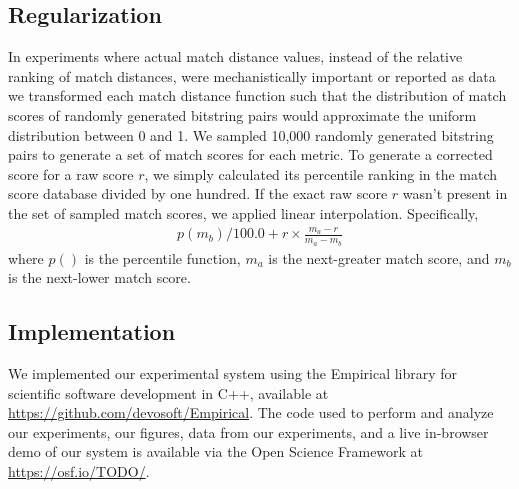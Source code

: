 \subsection{Regularization}

In experiments where actual match distance values, instead of the relative ranking of match distances, were mechanistically important or reported as data we transformed each match distance function such that the distribution of match scores of randomly generated bitstring pairs would approximate the uniform distribution between 0 and 1.
We sampled 10,000 randomly generated bitstring pairs to generate a set of match scores for each metric.
To generate a corrected score for a raw score $r$, we simply calculated its percentile ranking in the match score database divided by one hundred.
If the exact raw score $r$ wasn't present in the set of sampled match scores, we applied linear interpolation.
Specifically,
\begin{align*}
 p(m_b)/100.0 + r \times \frac{m_a - r}{m_a - m_b}
\end{align*}
where $p()$ is the percentile function, $m_a$ is the next-greater match score, and $m_b$ is the next-lower match score.

\subsection{Implementation}

We implemented our experimental system using the Empirical library for scientific software development in C++, available at \url{https://github.com/devosoft/Empirical}.
The code used to perform and analyze our experiments, our figures, data from our experiments, and a live in-browser demo of our system is available via the Open Science Framework at \url{https://osf.io/TODO/}.
